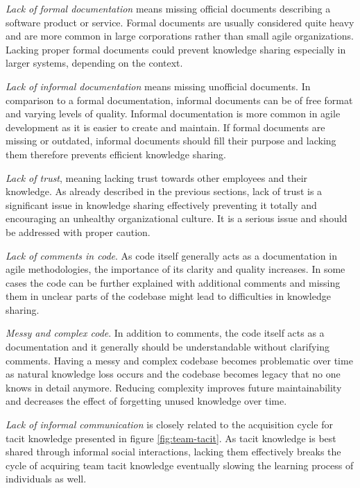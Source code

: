 \emph{Lack of formal documentation} means missing official documents describing a software product or service. Formal documents are usually considered quite heavy and are
more common in large corporations rather than small agile organizations. Lacking proper formal documents could prevent knowledge sharing especially in larger
systems, depending on the context. \citep{Ghobadi2016}

\emph{Lack of informal documentation} means missing unofficial documents. In comparison to a formal documentation, informal documents can be of free format and varying
levels of quality. Informal documentation is more common in agile development as it is easier to create and maintain. If formal documents are missing or outdated,
informal documents should fill their purpose and lacking them therefore prevents efficient knowledge sharing. \citep{Ghobadi2016}

\emph{Lack of trust}, meaning lacking trust towards other employees and their knowledge. As already described in the previous sections, lack of trust is a significant issue in
knowledge sharing effectively preventing it totally and encouraging an unhealthy organizational culture. It is a serious issue and should be addressed with proper caution.
\citep{Ersoy2015}

\emph{Lack of comments in code}. As code itself generally acts as a documentation in agile methodologies, the importance of its clarity and quality increases. In some cases
the code can be further explained with additional comments and missing them in unclear parts of the codebase might lead to difficulties in knowledge sharing. \citep{Stettina2013}

\emph{Messy and complex code}. In addition to comments, the code itself acts as a documentation and it generally should be understandable without clarifying comments.
Having a messy and complex codebase becomes problematic over time as natural knowledge loss occurs and the codebase becomes legacy that no one knows in detail anymore.
Reducing complexity improves future maintainability and decreases the effect of forgetting unused knowledge over time. \citep{Stettina2013}

\emph{Lack of informal communication} is closely related to the acquisition cycle for tacit knowledge presented in figure \ref{fig:team-tacit}. As tacit knowledge is best shared through
informal social interactions, lacking them effectively breaks the cycle of acquiring team tacit knowledge eventually slowing the learning process of individuals as 
well. \citep{Ghobadi2016}

